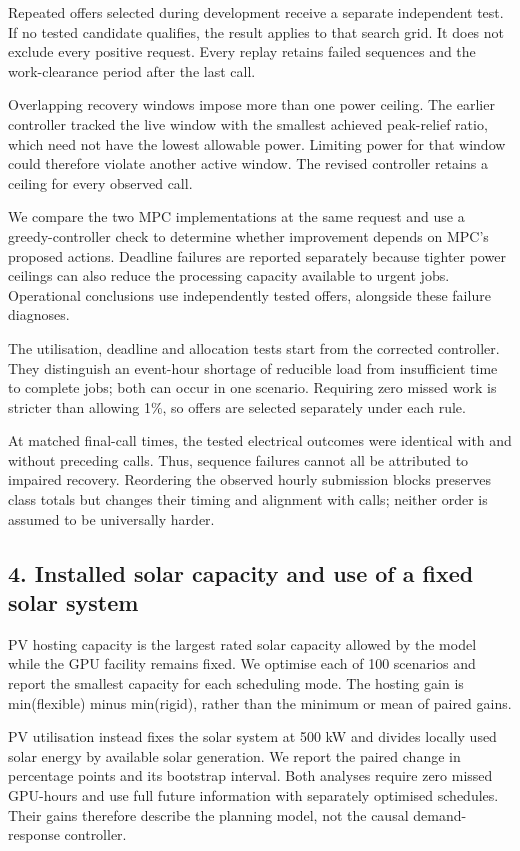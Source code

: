 \documentclass[10pt,a4paper]{article}
\begin{document}
Repeated offers selected during development receive a separate independent test. If no tested candidate qualifies, the result applies to that search grid. It does not exclude every positive request. Every replay retains failed sequences and the work-clearance period after the last call.


Overlapping recovery windows impose more than one power ceiling. The earlier controller tracked the live window with the smallest achieved peak-relief ratio, which need not have the lowest allowable power. Limiting power for that window could therefore violate another active window. The revised controller retains a ceiling for every observed call.


We compare the two MPC implementations at the same request and use a greedy-controller check to determine whether improvement depends on MPC's proposed actions. Deadline failures are reported separately because tighter power ceilings can also reduce the processing capacity available to urgent jobs. Operational conclusions use independently tested offers, alongside these failure diagnoses.


The utilisation, deadline and allocation tests start from the corrected controller. They distinguish an event-hour shortage of reducible load from insufficient time to complete jobs; both can occur in one scenario. Requiring zero missed work is stricter than allowing 1\%, so offers are selected separately under each rule.


At matched final-call times, the tested electrical outcomes were identical with and without preceding calls. Thus, sequence failures cannot all be attributed to impaired recovery. Reordering the observed hourly submission blocks preserves class totals but changes their timing and alignment with calls; neither order is assumed to be universally harder.


\subsection{4. Installed solar capacity and use of a fixed solar system}

PV hosting capacity is the largest rated solar capacity allowed by the model while the GPU facility remains fixed. We optimise each of 100 scenarios and report the smallest capacity for each scheduling mode. The hosting gain is min(flexible) minus min(rigid), rather than the minimum or mean of paired gains.


PV utilisation instead fixes the solar system at 500 kW and divides locally used solar energy by available solar generation. We report the paired change in percentage points and its bootstrap interval. Both analyses require zero missed GPU-hours and use full future information with separately optimised schedules. Their gains therefore describe the planning model, not the causal demand-response controller.
\end{document}
